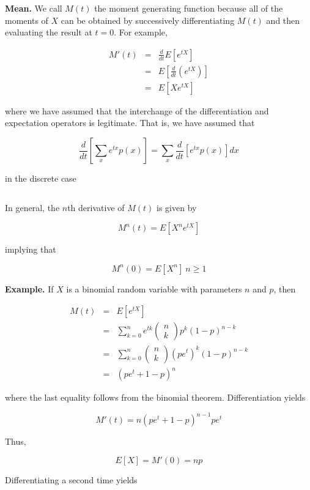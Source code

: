 $ $

\textbf{Mean.} We call $M(t)$ the moment generating function because all of the moments of $X$ can be obtained by successively differentiating $M(t)$ and then evaluating the result at $t = 0$. For example,

\begin{eqnarray*}
	M'(t) &=& \frac{d}{dt}E[e^{tX}]\\
	&=& E[\frac{d}{dt}(e^{tX})]\\
	&=& E[Xe^{tX}]
\end{eqnarray*}

where we have assumed that the interchange of the differentiation and expectation operators is legitimate. That is, we have assumed that

$$\frac{d}{dt}\left[\sum_xe^{tx}p(x)\right] = \sum_x \frac{d}{dt}\left[e^{tx}p(x)\right]dx$$

in the discrete case

$ $

In general, the $n$th derivative of $M(t)$ is given by

$$M^n(t) = E\left[X^ne^{tX}\right]$$

implying that 

$$M^n(0) = E\left[X^n\right] ~ n\geq 1$$

\newpage

\textbf{Example.} If $X$ is a binomial random variable with parameters $n$ and $p$, then 

\begin{eqnarray*}
	M(t) &=& E\left[e^{tX}\right]\\
	&=&\sum^n_{k=0}e^{tk}\left(\begin{matrix}
		n \\ k
	\end{matrix}\right) p^k( 1- p)^{n-k}\\
	&=& \sum^n_{k=0}\left(\begin{matrix}
		n\\k
	\end{matrix}\right)(pe^t)^k(1-p)^{n-k}\\
	&=&(pe^t + 1 - p)^n
\end{eqnarray*}

where the last equality follows from the binomial theorem. Differentiation yields

$$M'(t) = n(pe^t + 1 - p)^{n-1}pe^t$$

Thus,

$$E[X] = M'(0) = np$$

Differentiating a second time yields

